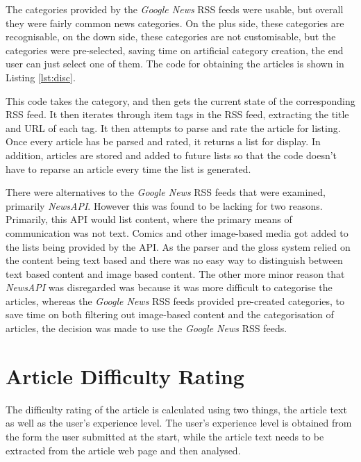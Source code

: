 The categories provided by the \textit{Google News} RSS feeds were usable, but overall they were fairly common news categories. On the plus side, these categories are recognisable, on the down side, these categories are not customisable, but the categories were pre-selected, saving time on artificial category creation, the end user can just select one of them. The code for obtaining the articles is shown in Listing \ref{lst:disc}.



This code takes the category, and then gets the current state of the corresponding RSS feed. It then iterates through item tags in the RSS feed, extracting the title and URL of each tag. It then attempts to parse and rate the article for listing. Once every article has be parsed and rated, it returns a list for display. In addition, articles are stored and added to future lists so that the code doesn't have to reparse an article every time the list is generated.

There were alternatives to the \textit{Google News} RSS feeds that were examined, primarily \textit{NewsAPI}. However this was found to be lacking for two reasons. Primarily, this API would list content, where the primary means of communication was not text. Comics and other image-based media got added to the lists being provided by the API. As the parser and the gloss system relied on the content being text based and there was no easy way to distinguish between text based content and image based content. The other more minor reason that \textit{NewsAPI} was disregarded was because it was more difficult to categorise the articles, whereas the \textit{Google News} RSS feeds provided pre-created categories, to save time on both filtering out image-based content and the categorisation of articles, the decision was made to use the \textit{Google News} RSS feeds. 


\section{Article Difficulty Rating}

The difficulty rating of the article is calculated using two things, the article text as well as the user's experience level. The user's experience level is obtained from the form the user submitted at the start, while the article text needs to be extracted from the article web page and then analysed.

